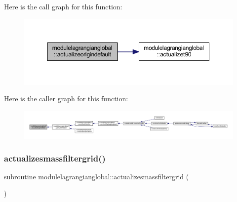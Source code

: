 Here is the call graph for this function\+:\nopagebreak
\begin{figure}[H]
\begin{center}
\leavevmode
\includegraphics[width=350pt]{namespacemodulelagrangianglobal_acd7b83696893d6d898a278da13db5768_cgraph}
\end{center}
\end{figure}
Here is the caller graph for this function\+:\nopagebreak
\begin{figure}[H]
\begin{center}
\leavevmode
\includegraphics[width=350pt]{namespacemodulelagrangianglobal_acd7b83696893d6d898a278da13db5768_icgraph}
\end{center}
\end{figure}
\mbox{\label{namespacemodulelagrangianglobal_a9f884711ce254712333517d3851888e9}} 
\subsubsection{\texorpdfstring{actualizesmassfiltergrid()}{actualizesmassfiltergrid()}}
{\footnotesize\ttfamily subroutine modulelagrangianglobal\+::actualizesmassfiltergrid (\begin{DoxyParamCaption}{ }\end{DoxyParamCaption})\hspace{0.3cm}{\ttfamily [private]}}


